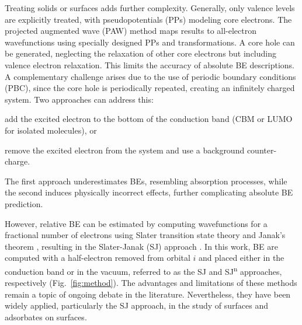 \documentclass[journal=jpccck,manuscript=article]{achemso}
\begin{document}
Treating solids or surfaces adds further complexity.\cite{garcia-gilCalculationCoreLevel2012,bagusXrayPhotoelectronSpectroscopy2024} Generally, only valence levels are explicitly treated, with pseudopotentials (PPs) modeling core electrons. The projected augmented wave (PAW) method maps results to all-electron wavefunctions using specially designed PPs and transformations\cite{blochlProjectorAugmentedwaveMethod1994}. A core hole can be generated, neglecting the relaxation of other core electrons but including valence electron relaxation\cite{garcia-gilCalculationCoreLevel2012}. This limits the accuracy of absolute BE descriptions.
A complementary challenge arises due to the use of periodic boundary conditions (PBC), since the core hole is periodically repeated, creating an infinitely charged system. Two approaches can address this: 
\begin{inparaenum}[(i)]
	\item add the excited electron to the bottom of the conduction band (CBM or LUMO for isolated molecules), or 
	\item remove the excited electron from the system and use a background counter-charge.
\end{inparaenum}
The first approach underestimates BEs, resembling absorption processes, while the second induces physically incorrect effects, further complicating absolute BE prediction.\cite{olovssonCorelevelShiftsComplex2006,garcia-gilCalculationCoreLevel2012,pueyobellafontPerformanceTPSSFunctional2016,pueyobellafontPredictingCoreLevel2017,taucherFinalStateSimulationsCoreLevel2020}

However, relative BE can be estimated by computing wavefunctions for a fractional number of electrons using Slater transition state theory and Janak's theorem \cite{janakProofThatFrac1978}, resulting in the Slater-Janak (SJ) approach \cite{hiraoImprovedSlaterTransition2021}. In this work, BE are computed with a half-electron removed from orbital $i$ and placed either in the conduction band or in the vacuum, referred to as the SJ and SJ\textsuperscript{n} approaches\cite{pueyobellafontPredictingCoreLevel2017}, respectively (Fig.~\ref{fig:method}). The advantages and limitations of these methods remain a topic of ongoing debate in the literature\cite{olovssonCorelevelShiftsComplex2006,taucherFinalStateSimulationsCoreLevel2020}. Nevertheless, they have been widely applied, particularly the SJ approach, in the study of surfaces\cite{olovssonFirstPrincipleCalculations2010,bagusRevisitingSurfaceCorelevel2019,bagusXrayPhotoelectronSpectroscopy2024} and adsorbates on surfaces\cite{babyAnchoringBendingPentacene2015,salvarezzaExploringCoreLevel2015,fujimoriInteractionWaterCaO2016a,taucherFinalStateSimulationsCoreLevel2020}.
\end{document}

